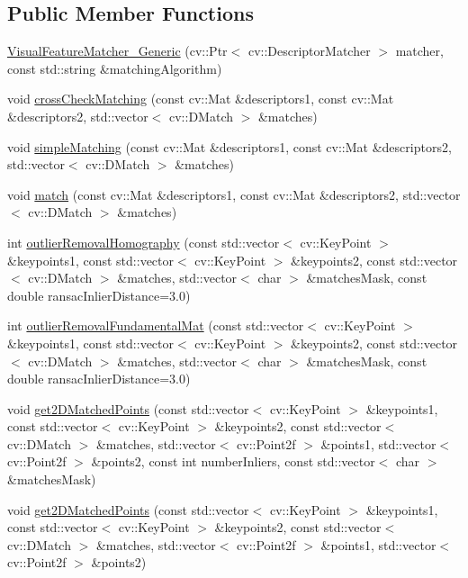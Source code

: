 \subsection*{Public Member Functions}
\begin{DoxyCompactItemize}
\item 
\hyperlink{class_visual_feature_matcher___generic_afb3206845d3f219b2da647b4224e5785}{VisualFeatureMatcher\_\-Generic} (cv::Ptr$<$ cv::DescriptorMatcher $>$ matcher, const std::string \&matchingAlgorithm)
\item 
void \hyperlink{class_visual_feature_matcher___generic_a4dd886147652cc05b8ae1b77f41c50dd}{crossCheckMatching} (const cv::Mat \&descriptors1, const cv::Mat \&descriptors2, std::vector$<$ cv::DMatch $>$ \&matches)
\item 
void \hyperlink{class_visual_feature_matcher___generic_a78cfb12bdfc7c9c3e8e1191630713a4f}{simpleMatching} (const cv::Mat \&descriptors1, const cv::Mat \&descriptors2, std::vector$<$ cv::DMatch $>$ \&matches)
\item 
void \hyperlink{class_visual_feature_matcher___generic_a8c45652a033f333938f5440486cd6fa9}{match} (const cv::Mat \&descriptors1, const cv::Mat \&descriptors2, std::vector$<$ cv::DMatch $>$ \&matches)
\item 
int \hyperlink{class_visual_feature_matcher___generic_a6f1654953bbd83f954bdbe1ed711fced}{outlierRemovalHomography} (const std::vector$<$ cv::KeyPoint $>$ \&keypoints1, const std::vector$<$ cv::KeyPoint $>$ \&keypoints2, const std::vector$<$ cv::DMatch $>$ \&matches, std::vector$<$ char $>$ \&matchesMask, const double ransacInlierDistance=3.0)
\item 
int \hyperlink{class_visual_feature_matcher___generic_a5fe8fbffca8ad33423eea2af12d34273}{outlierRemovalFundamentalMat} (const std::vector$<$ cv::KeyPoint $>$ \&keypoints1, const std::vector$<$ cv::KeyPoint $>$ \&keypoints2, const std::vector$<$ cv::DMatch $>$ \&matches, std::vector$<$ char $>$ \&matchesMask, const double ransacInlierDistance=3.0)
\item 
void \hyperlink{class_visual_feature_matcher___generic_a0adf4907dc8492986a013e2f7ba0931d}{get2DMatchedPoints} (const std::vector$<$ cv::KeyPoint $>$ \&keypoints1, const std::vector$<$ cv::KeyPoint $>$ \&keypoints2, const std::vector$<$ cv::DMatch $>$ \&matches, std::vector$<$ cv::Point2f $>$ \&points1, std::vector$<$ cv::Point2f $>$ \&points2, const int numberInliers, const std::vector$<$ char $>$ \&matchesMask)
\item 
void \hyperlink{class_visual_feature_matcher___generic_af473e2359dece0aaf1a5a31c357cfaac}{get2DMatchedPoints} (const std::vector$<$ cv::KeyPoint $>$ \&keypoints1, const std::vector$<$ cv::KeyPoint $>$ \&keypoints2, const std::vector$<$ cv::DMatch $>$ \&matches, std::vector$<$ cv::Point2f $>$ \&points1, std::vector$<$ cv::Point2f $>$ \&points2)
\end{DoxyCompactItemize}
